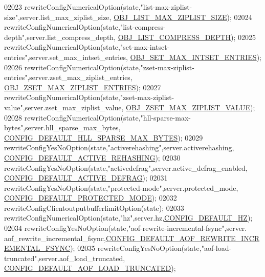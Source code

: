 \begin{DoxyCode}
{{{{{{{{{{{{{{{{{{{{{{{{{{{{02023     rewriteConfigNumericalOption(state,\textcolor{stringliteral}{"list-max-ziplist-size"},server.list\_max\_ziplist\_size,
      \hyperlink{server_8h_a27c7e814708df2c7eed37fbc6ac0b7f1}{OBJ\_LIST\_MAX\_ZIPLIST\_SIZE});
02024     rewriteConfigNumericalOption(state,\textcolor{stringliteral}{"list-compress-depth"},server.list\_compress\_depth,
      \hyperlink{server_8h_a7b811522f7befdc10e69883f360e45b4}{OBJ\_LIST\_COMPRESS\_DEPTH});
02025     rewriteConfigNumericalOption(state,\textcolor{stringliteral}{"set-max-intset-entries"},server.set\_max\_intset\_entries,
      \hyperlink{server_8h_a333fe7f520eb6f33cd1c88e4691de3ed}{OBJ\_SET\_MAX\_INTSET\_ENTRIES});
02026     rewriteConfigNumericalOption(state,\textcolor{stringliteral}{"zset-max-ziplist-entries"},server.zset\_max\_ziplist\_entries,
      \hyperlink{server_8h_ac29d7218c448fac5b27039cf0d73fde2}{OBJ\_ZSET\_MAX\_ZIPLIST\_ENTRIES});
02027     rewriteConfigNumericalOption(state,\textcolor{stringliteral}{"zset-max-ziplist-value"},server.zset\_max\_ziplist\_value,
      \hyperlink{server_8h_a24b004e72489e83f721bdd334234aa49}{OBJ\_ZSET\_MAX\_ZIPLIST\_VALUE});
02028     rewriteConfigNumericalOption(state,\textcolor{stringliteral}{"hll-sparse-max-bytes"},server.hll\_sparse\_max\_bytes,
      \hyperlink{server_8h_a479f69398ffb0f86fdbb4fa03876bc69}{CONFIG\_DEFAULT\_HLL\_SPARSE\_MAX\_BYTES});
02029     rewriteConfigYesNoOption(state,\textcolor{stringliteral}{"activerehashing"},server.activerehashing,
      \hyperlink{server_8h_a147863f3b338d25f54e026d88a487010}{CONFIG\_DEFAULT\_ACTIVE\_REHASHING});
02030     rewriteConfigYesNoOption(state,\textcolor{stringliteral}{"activedefrag"},server.active\_defrag\_enabled,
      \hyperlink{server_8h_a7bc03a080189821c8c88b31027281d4b}{CONFIG\_DEFAULT\_ACTIVE\_DEFRAG});
02031     rewriteConfigYesNoOption(state,\textcolor{stringliteral}{"protected-mode"},server.protected\_mode,
      \hyperlink{server_8h_aa84cedc4d9e3da82d28324a85626a666}{CONFIG\_DEFAULT\_PROTECTED\_MODE});
02032     rewriteConfigClientoutputbufferlimitOption(state);
02033     rewriteConfigNumericalOption(state,\textcolor{stringliteral}{"hz"},server.hz,\hyperlink{server_8h_aa5a3b127e21d6bf089025d953c44678a}{CONFIG\_DEFAULT\_HZ});
02034     rewriteConfigYesNoOption(state,\textcolor{stringliteral}{"aof-rewrite-incremental-fsync"},server.
      aof\_rewrite\_incremental\_fsync,\hyperlink{server_8h_a356d1b1e39a75671cc55fdaf64be3a85}{CONFIG\_DEFAULT\_AOF\_REWRITE\_INCREMENTAL\_FSYNC});
02035     rewriteConfigYesNoOption(state,\textcolor{stringliteral}{"aof-load-truncated"},server.aof\_load\_truncated,
      \hyperlink{server_8h_a35b94be7201c7ad80e43f8aa214867b7}{CONFIG\_DEFAULT\_AOF\_LOAD\_TRUNCATED});
}}}}}}}}}}}}}}}}}}}}}}}}}}}}
\end{DoxyCode}

